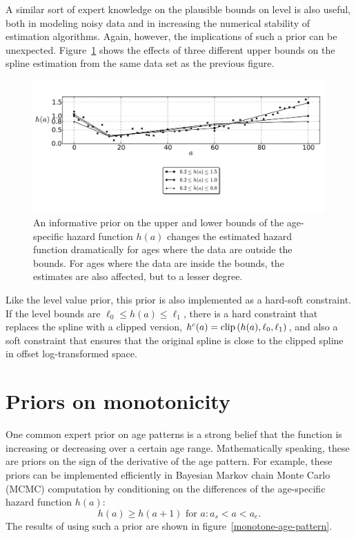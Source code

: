 A similar sort of expert knowledge on the plausible bounds on
level is also useful, both in modeling noisy data and in increasing
the numerical stability of estimation algorithms. Again, however, the
implications of such a prior can be unexpected.
Figure~\ref{level-bounds-priors} shows the effects of three different
upper bounds on the spline estimation from the same data set as the
previous figure.

\begin{figure}[h]
\begin{center}
\includegraphics[width=\textwidth]{level_bound-smoothing-splines.pdf}
\caption{An informative prior on the upper and
lower bounds of the age-specific hazard function $h(a)$ changes the estimated hazard function dramatically for
ages where the data are outside the bounds. For ages where the data are
inside the bounds, the estimates are also affected, but to a lesser
degree.}
\label{level-bounds-priors}
\end{center}
\end{figure}



Like the level value prior, this prior is also implemented as a
hard-soft constraint.  If the level bounds are $\ell_0 \leq h(a)
\leq \ell_1$, there is a hard constraint that replaces the spline with a
clipped version, $h^c(a) = \operatorname{clip}\left(h(a), \ell_0, \ell_1\right)$, and
also a soft constraint that ensures that the original spline is close to the clipped
spline in offset log-transformed space.

\section{Priors on monotonicity}

One common expert prior on age patterns is a strong belief that the
function is increasing or decreasing over a certain age
range. Mathematically speaking, these are priors on the sign of the
derivative of the age pattern.  For example, these priors can be implemented efficiently in
Bayesian Markov chain Monte Carlo (MCMC) computation by conditioning on the differences of the
age-specific hazard function $h(a)$:
\[
h(a) \geq h(a+1) \text{ for } a : a_s < a < a_e.
\]
The results of using such a prior are shown in
figure~\ref{monotone-age-pattern}.


